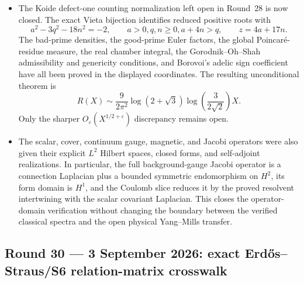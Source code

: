\begin{itemize}[leftmargin=1.8em]
\item The Koide defect-one counting normalization left open in Round~28 is
now closed.  The exact Vieta bijection identifies reduced positive roots with
\[
 a^2-3q^2-18n^2=-2,\qquad
 a>0, q,n\ge0, a+4n>q,\qquad z=4a+17n.
\]
The bad-prime densities, the good-prime Euler factors, the global
Poincar\'e-residue measure, the real chamber integral, the
Gorodnik--Oh--Shah admissibility and genericity conditions, and Borovoi's
adelic sign coefficient have all been proved in the displayed coordinates.
The resulting unconditional theorem is
\[
 R(X)\sim
 \frac9{2\pi^2}\log(2+\sqrt3)
 \log\!\left(\frac3{2\sqrt2}\right)X.
\]
Only the sharper
\(O_\varepsilon(X^{1/2+\varepsilon})\) discrepancy remains open.

\item The scalar, cover, continuum gauge, magnetic, and Jacobi operators were
also given their explicit \(L^2\) Hilbert spaces, closed forms, and
self-adjoint realizations.  In particular, the full background-gauge Jacobi
operator is a connection Laplacian plus a bounded symmetric endomorphism on
\(H^2\), its form domain is \(H^1\), and the Coulomb slice reduces it by the
proved resolvent intertwining with the scalar covariant Laplacian.  This
closes the operator-domain verification without changing the boundary between
the verified classical spectra and the open physical Yang--Mills transfer.
\end{itemize}

\subsection*{Round 30 --- 3 September 2026: exact
Erd\H{o}s--Straus/S6 relation-matrix crosswalk}

